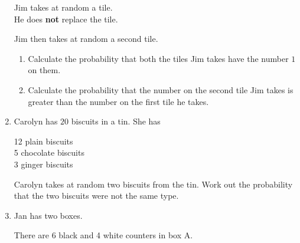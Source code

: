 \begin{enumerate}
\begin{figure}[H]
  \end{figure}
  Jim takes at random a tile.\\
  He does \textbf{not} replace the tile.\par 
  Jim then takes at random a second tile.
  \begin{enumerate}
    \item Calculate the probability that both the tiles Jim takes have the number $1$ on them.\\[4cm]\vspace*{0pt}\hfill\dline
    \item Calculate the probability that the number on the second tile Jim takes is greater than the number on the first tile he takes.
  \end{enumerate}
  \newpage
  \item Carolyn has $20$ biscuits in a tin. She has\par 
  \hspace*{2cm}12 plain biscuits\\
	\hspace*{2cm}5 chocolate biscuits\\
	\hspace*{2cm}3 ginger biscuits\par
  Carolyn takes at random two biscuits from the tin. Work out the probability that the two biscuits were not the same type.\\[3cm]\mbox{}
  \item Jan has two boxes.\par
  There are 6 black and 4 white counters in box A.\\

\end{enumerate}
